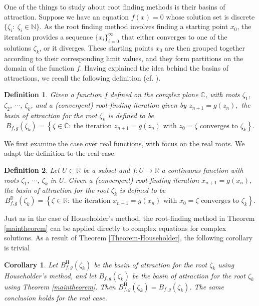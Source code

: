 \documentclass{article}
\newtheorem{corollary}{Corollary}[theorem]
\newtheorem{definition}{Definition}%
\begin{document}
One of the things to study about root finding methods is their basins of attraction. Suppose we have an equation $f(x)=0$ whose solution set is discrete $\{\zeta_{i}:\ \zeta_{i}\in\mathbb{N}\}$. As the root finding method involves finding a starting point $x_{0}$, the iteration provides a sequence $\{x_{i}\}_{i=0}^{\infty}$ that either converges to one of the solutions $\zeta_{k}$, or it diverges. These starting points $x_{0}$ are then grouped together according to their corresponding limit values, and they form partitions on the domain of the function $f$. Having explained the idea behind the basins of attractions, we recall the following definition (cf. \cite{Epperson-2015, NRA-2020, OR-2000}).
\medskip
\begin{definition}
Given a function $f$ defined on the complex plane $\mathbb{C}$, with roots $\zeta_{1}$, $\zeta_{2}$, $\cdots$, $\zeta_{k}$, and a (convergent) root-finding iteration given by 
$
z_{n+1} = g(z_{n}),
$
the basin of attraction for the root $\zeta_{k}$ is defined to be 
\[
B_{f,g}(\zeta_{k})=
\left\{
\zeta \in\mathbb{C}:\ \text{the iteration }z_{n+1}=g(z_{n})\text{ with }z_{0}=\zeta\text{ converges to }\zeta_{k}\right\}.
\]
\end{definition}

We first examine the case over real functions, with focus on the real roots. We adapt the definition to the real case. 
\medskip
\begin{definition}
Let $U\subset\mathbb{R}$ be a subset and $f:U\rightarrow\mathbb{R}$ a continuous function with roots $\zeta_{1}$, $\cdots$, $\zeta_{k}$ in $U$. Given a (convergent) root-finding iteration  
$
x_{n+1}=g(x_{n}),
$
the basin of attraction for the root $\zeta_{k}$ is defined to be
\[
B_{f,g}^{\mathbb{R}}(\zeta_{k})=\left\{
\zeta \in\mathbb{R}:\ \text{the iteration }x_{n+1}=g(x_{n})\text{ with }x_{0}=\zeta\text{ converges to }\zeta_{k}\right\}.
\]
\end{definition}

Just as in the case of Householder's method, the root-finding method in Theorem \ref{maintheorem} can be applied directly to complex equations for complex solutions. As a result of Theorem \ref{Theorem-Householder}, the  following corollary is trivial
\medskip
\begin{corollary} \label{cor-BA}
	Let $B_{f,g}^{\text{H}}(\zeta_{k})$ be the basin of attraction for the root $\zeta_{k}$ using Householder's method, and let $B_{f,g}(\zeta_{k})$ be the basin of attraction for the root $\zeta_{k}$ using Theorem \ref{maintheorem}. Then $B_{f,g}^{\text{H}}(\zeta_{k})=B_{f,g}(\zeta_{k})$. The same conclusion holds for the real case. 
\end{corollary}
\medskip
\end{document}
